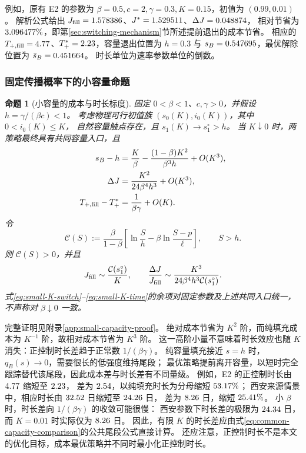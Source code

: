 \documentclass[11pt,a4paper,UTF8]{ctexart}
\newtheorem{proposition}[theorem]{命题}
\theoremstyle{definition}
\newcommand{\Dur}[1]{\num[round-mode=places,round-precision=2]{#1}}
\begin{document}
例如，原有 E2 的参数为 $\beta=0.5,c=2,\gamma=0.3,K=0.15$，初值为 $(0.99,0.01)$。
解析公式给出 $J_{\rm fill}=1.578386$、$J^*=1.529511$、$\Delta J=0.048874$，
相对节省为 $3.096477\%$，即第\ref{sec:switching-mechanism}节所述提前退出的成本节省。
相应的 $T_{+,\rm fill}=\Dur{\DtimeFillE}$、$T_+^*=\Dur{\DtimeOptE}$，容量退出位置为
$h=0.3$ 与 $s_B=0.547695$，最优解除位置为 $\bar s_B=0.451664$。
时长单位为速率参数单位的倒数。

\subsubsection{固定传播概率下的小容量命题}
\begin{proposition}[小容量的成本与时长标度]
\label{prop:small-capacity}
固定 $0<\beta<1$、$c,\gamma>0$，并假设 $h=\gamma/(\beta c)<1$。
考虑物理可行初值族 $(s_0(K),i_0(K))$，其中 $0<i_0(K)\le K$，
自然容量触点存在，且 $s_1(K)\to s_1^\circ>h$。
当 $K\downarrow0$ 时，两策略最终具有共同容量入口，且
\begin{align}
 s_B-h&=\frac K\beta-\frac{(1-\beta)K^2}{\beta^3h}+O(K^3),
 \label{eq:small-K-switch}\\
 \Delta J&=\frac{K^2}{24\beta^4h^3}+O(K^3),
 \label{eq:small-K-cost}\\
 T_{+,\rm fill}-T_+^*&=\frac1{\beta\gamma}+O(K).
 \label{eq:small-K-time}
\end{align}
令
\begin{equation}
 \mathcal C(S):=\frac\beta{1-\beta}
 \left[\ln\frac Sh-\beta\ln\frac{S-p}{\ell}\right],\qquad S>h.
 \label{eq:small-K-C}
\end{equation}
则 $\mathcal C(S)>0$，并且
\begin{equation}
 J_{\rm fill}\sim\frac{\mathcal C(s_1^\circ)}K,\qquad
 \frac{\Delta J}{J_{\rm fill}}
 \sim\frac{K^3}{24\beta^4h^3\mathcal C(s_1^\circ)}.
 \label{eq:small-K-relative}
\end{equation}
式\eqref{eq:small-K-switch}--\eqref{eq:small-K-time}的余项对固定参数及上述共同入口统一，
不声称对 $\beta\downarrow0$ 一致。
\end{proposition}
完整证明见附录\ref{app:small-capacity-proof}。
绝对成本节省为 $K^2$ 阶，而纯填充成本为 $K^{-1}$ 阶，故相对成本节省为 $K^3$ 阶。
这一高阶小量不意味着时长效应也随 $K$ 消失：正控制时长差趋于正常数 $1/(\beta\gamma)$。
纯容量填充接近 $s=h$ 时，$q_B(s)\to0$，需要很长的低强度维持尾段；
最优策略提前离开容量，以短时完全跟踪替代该尾段，因此成本差与时长差有不同量级。
例如，E2 的正控制时长由 $\Dur{\DtimeFillE}$ 缩短至 $\Dur{\DtimeOptE}$，
差为 $\Dur{\DtimeDeltaE}$，以纯填充时长为分母缩短 $53.17\%$；
西安来源情景中，相应时长由 $\Dur{\DtimeFillZ}$ 日缩短至 $\Dur{\DtimeOptZ}$ 日，
差为 $\Dur{\DtimeDeltaZ}$ 日，缩短 $25.41\%$。
小 $\beta$ 时，时长差向 $1/(\beta\gamma)$ 的收敛可能很慢：
西安参数下时长差的极限为 $\Dur{\DtimeLimitZ}$ 日，而 $K=0.01$ 时实际仅为 $\Dur{\DtimeDeltaZBrief}$ 日。
因此，有限 $K$ 的时长差应由式\eqref{eq:common-capacity-comparison}的公共尾段公式直接计算。
还应注意，正控制时长不是本文的优化目标，成本最优策略并不同时最小化正控制时长。
\end{document}
